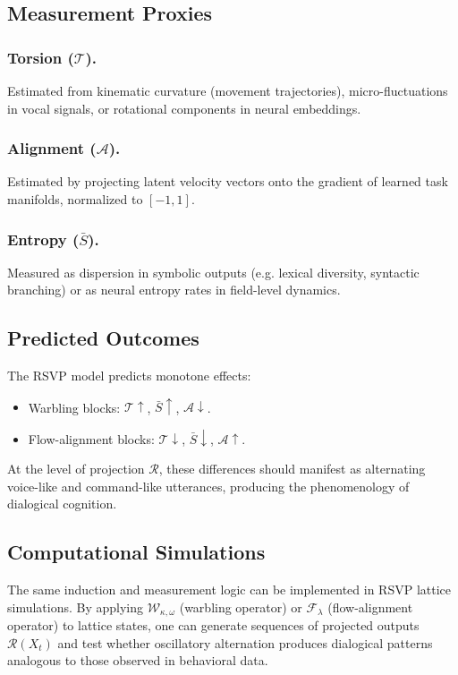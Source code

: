 \documentclass[a4paper,11pt]{article}
\begin{document}
\subsection{Measurement Proxies}

\subsubsection{Torsion ($\mathcal{T}$).}
Estimated from kinematic curvature (movement trajectories), micro-fluctuations
in vocal signals, or rotational components in neural embeddings.

\subsubsection{Alignment ($\mathcal{A}$).}
Estimated by projecting latent velocity vectors onto the gradient of learned
task manifolds, normalized to $[-1,1]$.

\subsubsection{Entropy ($\bar{S}$).}
Measured as dispersion in symbolic outputs (e.g. lexical diversity, syntactic
branching) or as neural entropy rates in field-level dynamics.

\subsection{Predicted Outcomes}
The RSVP model predicts monotone effects:
\begin{itemize}
    \item Warbling blocks: $\mathcal{T}\uparrow$, $\bar{S}\uparrow$,
    $\mathcal{A}\downarrow$.
    \item Flow-alignment blocks: $\mathcal{T}\downarrow$, $\bar{S}\downarrow$,
    $\mathcal{A}\uparrow$.
\end{itemize}
At the level of projection $\mathcal{R}$, these differences should manifest as
alternating voice-like and command-like utterances, producing the phenomenology
of dialogical cognition.

\subsection{Computational Simulations}
The same induction and measurement logic can be implemented in RSVP lattice
simulations. By applying $\mathcal{W}_{\kappa,\omega}$ (warbling operator) or
$\mathcal{F}_\lambda$ (flow-alignment operator) to lattice states, one can
generate sequences of projected outputs $\mathcal{R}(X_t)$ and test whether
oscillatory alternation produces dialogical patterns analogous to those observed
in behavioral data.
\end{document}
